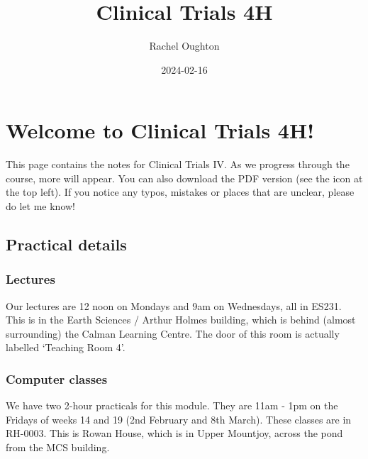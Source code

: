 \documentclass[
  openany]{book}
\title{Clinical Trials 4H}
\author{Rachel Oughton}
\date{2024-02-16}
\theoremstyle{definition}
\theoremstyle{definition}
\theoremstyle{definition}
\theoremstyle{definition}
\theoremstyle{remark}
\begin{document}
\maketitle

{
\setcounter{tocdepth}{1}
\tableofcontents
}
\hypertarget{welcome-to-clinical-trials-4h}{%
\chapter*{Welcome to Clinical Trials 4H!}\label{welcome-to-clinical-trials-4h}}

This page contains the notes for Clinical Trials IV. As we progress through the course, more will appear. You can also download the PDF version (see the icon at the top left). If you notice any typos, mistakes or places that are unclear, please do let me know!

\hypertarget{practical-details}{%
\section*{Practical details}\label{practical-details}}

\hypertarget{lectures}{%
\subsection*{Lectures}\label{lectures}}

Our lectures are 12 noon on Mondays and 9am on Wednesdays, all in ES231. This is in the Earth Sciences / Arthur Holmes building, which is behind (almost surrounding) the Calman Learning Centre. The door of this room is actually labelled `Teaching Room 4'.

\hypertarget{computer-classes}{%
\subsection*{Computer classes}\label{computer-classes}}

We have two 2-hour practicals for this module. They are 11am - 1pm on the Fridays of weeks 14 and 19 (2nd February and 8th March). These classes are in RH-0003. This is Rowan House, which is in Upper Mountjoy, across the pond from the MCS building.
\end{document}
